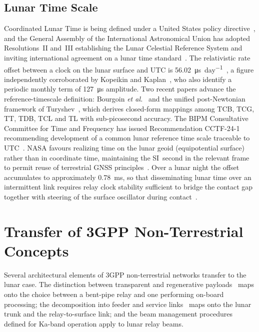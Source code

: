 \documentclass[11pt,a4paper]{article}
\begin{document}
\subsection{Lunar Time Scale}
Coordinated Lunar Time is being defined under a United States policy directive~\cite{ostp_ltc}, and the General Assembly of the International Astronomical Union has adopted Resolutions~II and~III establishing the Lunar Celestial Reference System and inviting international agreement on a lunar time standard~\cite{iau_2024_resolutions}. The relativistic rate offset between a clock on the lunar surface and UTC is \SI{56.02}{\micro\second\per day}~\cite{ashby_lunar_time}, a figure independently corroborated by Kopeikin and Kaplan~\cite{kopeikin_kaplan}, who also identify a periodic monthly term of \SI{127}{\micro\second} amplitude. Two recent papers advance the reference-timescale definition: Bourgoin \emph{et al.}~\cite{bourgoin_ltc} and the unified post-Newtonian framework of Turyshev~\cite{turyshev_2026}, which derives closed-form mappings among TCB, TCG, TT, TDB, TCL and TL with sub-picosecond accuracy. The BIPM Consultative Committee for Time and Frequency has issued Recommendation CCTF-24-1 recommending development of a common lunar reference time scale traceable to UTC~\cite{bipm_cctf24_1}. NASA favours realizing time on the lunar geoid (equipotential surface) rather than in coordinate time, maintaining the SI~second in the relevant frame to permit reuse of terrestrial GNSS principles~\cite{ostp_ltc}. Over a lunar night the offset accumulates to approximately \SI{0.78}{ms}, so that disseminating lunar time over an intermittent link requires relay clock stability sufficient to bridge the contact gap together with steering of the surface oscillator during contact~\cite{ansalone_lcrns_time}.


\section{Transfer of 3GPP Non-Terrestrial Concepts}
\label{sec:ntn}

Several architectural elements of 3GPP non-terrestrial networks transfer to the lunar case. The distinction between transparent and regenerative payloads~\cite{3gpp_tr_38821} maps onto the choice between a bent-pipe relay and one performing on-board processing; the decomposition into feeder and service links~\cite{3gpp_tr_38811,3gpp_ntn_overview} maps onto the lunar trunk and the relay-to-surface link; and the beam management procedures defined for Ka-band operation apply to lunar relay beams.
\end{document}
